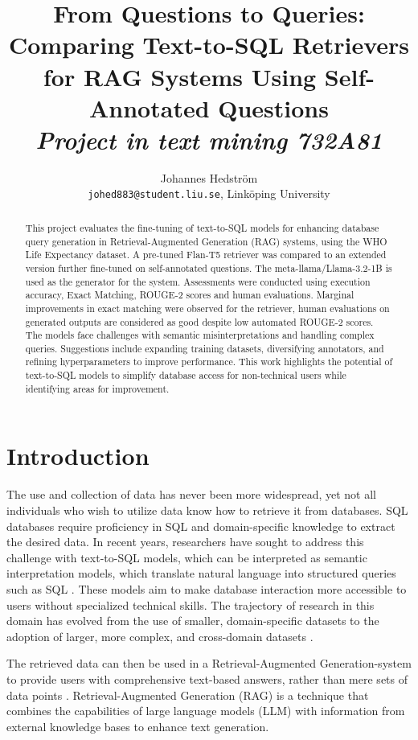 \documentclass[11pt]{article}
\title{From Questions to Queries: Comparing Text-to-SQL Retrievers for RAG Systems Using Self-Annotated Questions \\ \large \textit{Project in text mining 732A81}}
\author{ Johannes Hedström\\ \texttt{johed883@student.liu.se}, Linköping University 
  }
\begin{document}
\maketitle

\begin{abstract}
This project evaluates the fine-tuning of text-to-SQL models for enhancing database query generation in Retrieval-Augmented Generation (RAG) systems, using the WHO Life Expectancy dataset. A pre-tuned Flan-T5 retriever was compared to an extended version further fine-tuned on self-annotated questions. The meta-llama/Llama-3.2-1B is used as the generator for the system. Assessments were conducted using execution accuracy, Exact Matching, ROUGE-2 scores and human evaluations. Marginal improvements in exact matching were observed for the retriever, human evaluations on generated outputs are considered as good despite low automated ROUGE-2 scores. The models face challenges with semantic misinterpretations and handling complex queries. Suggestions include expanding training datasets, diversifying annotators, and refining hyperparameters to improve performance. This work highlights the potential of text-to-SQL models to simplify database access for non-technical users while identifying areas for improvement.

\end{abstract}

\section{Introduction}

The use and collection of data has never been more widespread, yet not all individuals who wish to utilize data know how to retrieve it from databases. SQL databases require proficiency in SQL and domain-specific knowledge to extract the desired data. In recent years, researchers have sought to address this challenge with text-to-SQL models, which can be interpreted as semantic interpretation models, which translate natural language into structured queries such as SQL \cite{spider}. These models aim to make database interaction more accessible to users without specialized technical skills\cite{metadata}. The trajectory of research in this domain has evolved from the use of smaller, domain-specific datasets to the adoption of larger, more complex, and cross-domain datasets \cite{spider}.

The retrieved data can then be used in a Retrieval-Augmented Generation-system to provide users with comprehensive text-based answers, rather than mere sets of data points \cite{metadata}. Retrieval-Augmented Generation (RAG) is a technique that combines the capabilities of large language models (LLM) with information from external knowledge bases to enhance text generation. 
\end{document}
